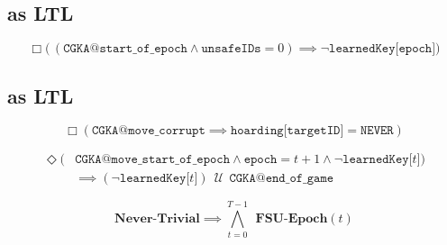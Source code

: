 \hypertarget{sec:pcs-as-ltl}{%
\subsection{ as LTL}\label{sec:pcs-as-ltl}}

\begin{LTL}
    $$
    \Box \Big(\, ( \texttt{CGKA@start\_of\_epoch} \land \texttt{unsafeIDs} = 0 ) \implies \neg \texttt{learnedKey[epoch]} \Big)
    $$
\end{LTL}


\hypertarget{sec:fsu-as-ltl}{%
\subsection{ as LTL}\label{sec:fsu-as-ltl}}

\begin{LTL}
    $$
    \Box \left( \texttt{CGKA@move\_corrupt} \implies \texttt{hoarding[targetID]} = \texttt{NEVER} \right)
    $$
\end{LTL}

\begin{LTL}
    \begin{equation*}
    \begin{split}
    \Diamond ( & \texttt{CGKA@move\_start\_of\_epoch} \land \texttt{epoch} = t + 1 \land \neg \texttt{learnedKey[$t$]} ) \\
    & \implies ( \neg \texttt{learnedKey[$t$]} ) \,\;{\mathcal {U}}\;\, \texttt{CGKA@end\_of\_game}
    \end{split}
    \end{equation*}
\end{LTL}

\begin{LTL}
    $$
    \textbf{Never-Trivial} \implies \bigwedge\limits_{t=0}^{T-1} \;\,\textbf{FSU-Epoch}(t)
    $$
\end{LTL}
